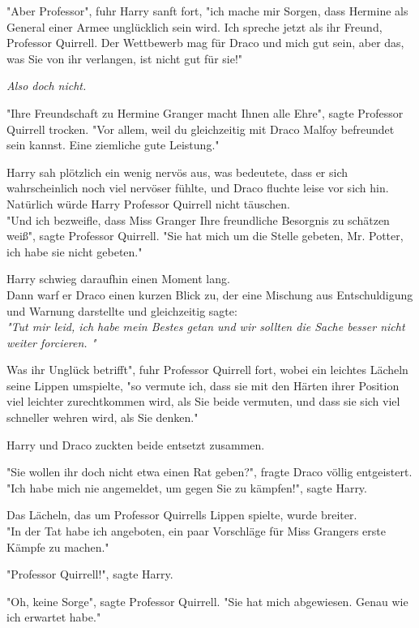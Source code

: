 {"Aber Professor", fuhr Harry sanft fort, "ich mache mir Sorgen, dass Hermine als General einer Armee unglücklich sein wird. Ich spreche jetzt als ihr Freund, Professor Quirrell. Der Wettbewerb mag für Draco und mich gut sein, aber das, was Sie von ihr verlangen, ist nicht gut für sie!"

\emph{Also doch nicht.}

"Ihre Freundschaft zu Hermine Granger macht Ihnen alle Ehre", sagte Professor Quirrell trocken. "Vor allem, weil du gleichzeitig mit Draco Malfoy befreundet sein kannst. Eine ziemliche gute Leistung."

Harry sah plötzlich ein wenig nervös aus, was bedeutete, dass er sich wahrscheinlich noch viel nervöser fühlte, und Draco fluchte leise vor sich hin.\\ Natürlich würde Harry Professor Quirrell nicht täuschen.\\ "Und ich bezweifle, dass Miss Granger Ihre freundliche Besorgnis zu schätzen weiß", sagte Professor Quirrell. "Sie hat mich um die Stelle gebeten, Mr. Potter, ich habe sie nicht gebeten."

Harry schwieg daraufhin einen Moment lang.\\ Dann warf er Draco einen kurzen Blick zu, der eine Mischung aus Entschuldigung und Warnung darstellte und gleichzeitig sagte:\\ \emph{"Tut mir leid, ich habe mein Bestes getan und wir sollten die Sache besser nicht weiter forcieren. "}

Was ihr Unglück betrifft", fuhr Professor Quirrell fort, wobei ein leichtes Lächeln seine Lippen umspielte, "so vermute ich, dass sie mit den Härten ihrer Position viel leichter zurechtkommen wird, als Sie beide vermuten, und dass sie sich viel schneller wehren wird, als Sie denken."

Harry und Draco zuckten beide entsetzt zusammen.

"Sie wollen ihr doch nicht etwa einen Rat geben?", fragte Draco völlig entgeistert.\\ "Ich habe mich nie angemeldet, um gegen Sie zu kämpfen!", sagte Harry.

Das Lächeln, das um Professor Quirrells Lippen spielte, wurde breiter.\\ "In der Tat habe ich angeboten, ein paar Vorschläge für Miss Grangers erste Kämpfe zu machen."

"Professor Quirrell!", sagte Harry.

"Oh, keine Sorge", sagte Professor Quirrell. "Sie hat mich abgewiesen. Genau wie ich erwartet habe."

}
